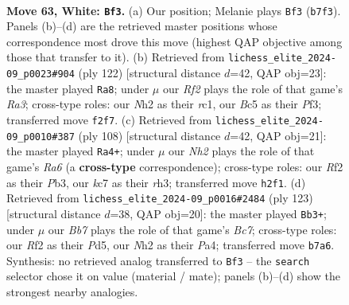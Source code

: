 \documentclass[11pt]{article}
\begin{document}
\clearpage

\begin{figure}[p]\centering
\begin{subfigure}{0.46\textwidth}\centering
\resizebox{\linewidth}{!}{%
\newchessgame
\chessboard[
  setfen={8/1Bk5/4b3/2B4r/PK6/1P5p/5R1N/8 w - - 4 63},
  showmover=false,
  pgfstyle=straightmove, color=movearrow, markmove={b7-f3}
]}
\caption{}
\end{subfigure}\hfill
\begin{subfigure}{0.46\textwidth}\centering
\resizebox{\linewidth}{!}{%
\newchessgame
\chessboard[
  setfen={8/8/2p2Bk1/2Pb2P1/5K2/R4P2/p7/2r5 w - - 9 62},
  showmover=false,
  pgfstyle=straightmove, color=movearrow, markmove={a3-a8}
]}
\caption{}
\end{subfigure}
\\[4pt]
\begin{subfigure}{0.46\textwidth}\centering
\resizebox{\linewidth}{!}{%
\newchessgame
\chessboard[
  setfen={5b2/8/R1p5/2P5/4k3/1P2B2r/P3K3/8 w - - 3 55},
  showmover=false,
  pgfstyle=straightmove, color=movearrow, markmove={a6-a4}
]}
\caption{}
\end{subfigure}\hfill
\begin{subfigure}{0.46\textwidth}\centering
\resizebox{\linewidth}{!}{%
\newchessgame
\chessboard[
  setfen={8/5k2/R2B1p2/3p4/p2P4/P7/r1bK4/8 b - - 19 62},
  showmover=false,
  pgfstyle=straightmove, color=movearrow, markmove={c2-b3}
]}
\caption{}
\end{subfigure}
\caption{\textbf{Move 63, White: \texttt{Bf3}.} (a) Our position; Melanie plays \texttt{Bf3} (\texttt{b7f3}). Panels (b)--(d) are the retrieved master positions whose correspondence most drove this move (highest QAP objective among those that transfer to it). (b) Retrieved from \texttt{lichess\_elite\_2024-09\_p0023\#904} (ply 122) [structural distance $d$=42, QAP obj=23]: the master played \texttt{Ra8}; under $\mu$ our \emph{Rf2} plays the role of that game's \emph{Ra3}; cross-type roles: our \emph{N}h2 as their \emph{r}c1, our \emph{B}c5 as their \emph{P}f3; transferred move \texttt{f2f7}. (c) Retrieved from \texttt{lichess\_elite\_2024-09\_p0010\#387} (ply 108) [structural distance $d$=42, QAP obj=21]: the master played \texttt{Ra4+}; under $\mu$ our \emph{Nh2} plays the role of that game's \emph{Ra6} (a \textbf{cross-type} correspondence); cross-type roles: our \emph{R}f2 as their \emph{P}b3, our \emph{k}c7 as their \emph{r}h3; transferred move \texttt{h2f1}. (d) Retrieved from \texttt{lichess\_elite\_2024-09\_p0016\#2484} (ply 123) [structural distance $d$=38, QAP obj=20]: the master played \texttt{Bb3+}; under $\mu$ our \emph{Bb7} plays the role of that game's \emph{Bc7}; cross-type roles: our \emph{R}f2 as their \emph{P}d5, our \emph{N}h2 as their \emph{P}a4; transferred move \texttt{b7a6}. Synthesis: no retrieved analog transferred to \texttt{Bf3} -- the \texttt{search} selector chose it on value (material / mate); panels (b)--(d) show the strongest nearby analogies.}
\label{fig:thought-m124}
\end{figure}
\end{document}
